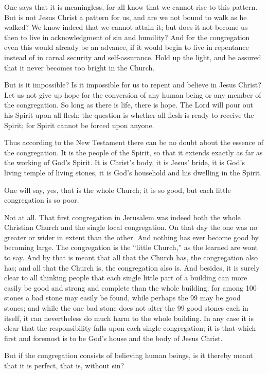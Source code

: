 One says that it is meaningless, for all know that we cannot rise to this pattern. But is not Jesus Christ a pattern for us, and are we not bound to walk as he walked? We know indeed that we cannot attain it; but does it not become us then to live in acknowledgment of sin and humility? And for the congregation even this would already be an advance, if it would begin to live in repentance instead of in carnal security and self-assurance. Hold up the light, and be assured that it never becomes too bright in the Church.

But is it impossible? Is it impossible for us to repent and believe in Jesus Christ? Let us not give up hope for the conversion of any human being or any member of the congregation. So long as there is life, there is hope. The Lord will pour out his Spirit upon all flesh; the question is whether all flesh is ready to receive the Spirit; for Spirit cannot be forced upon anyone.

Thus according to the New Testament there can be no doubt about the essence of the congregation. It is the people of the Spirit, so that it extends exactly as far as the working of God’s Spirit. It is Christ’s body, it is Jesus’ bride, it is God’s living temple of living stones, it is God’s household and his dwelling in the Spirit.

One will say, yes, that is the whole Church; it is so good, but each little congregation is so poor.

Not at all. That first congregation in Jerusalem was indeed both the whole Christian Church and the single local congregation. On that day the one was no greater or wider in extent than the other. And nothing has ever become good by becoming large. The congregation is the “little Church,” as the learned are wont to say. And by that is meant that all that the Church has, the congregation also has; and all that the Church is, the congregation also is. And besides, it is surely clear to all thinking people that each single little part of a building can more easily be good and strong and complete than the whole building; for among 100 stones a bad stone may easily be found, while perhaps the 99 may be good stones; and while the one bad stone does not alter the 99 good stones each in itself, it can nevertheless do much harm to the whole building. In any case it is clear that the responsibility falls upon each single congregation; it is that which first and foremost is to be God’s house and the body of Jesus Christ.

But if the congregation consists of believing human beings, is it thereby meant that it is perfect, that is, without sin?

